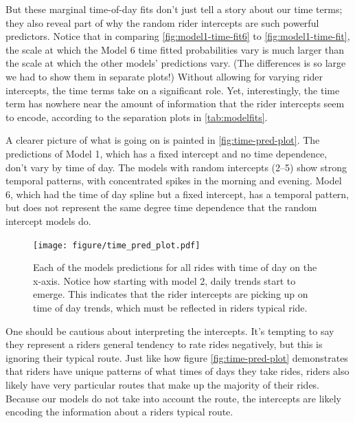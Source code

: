 \documentclass[12pt,twoside]{reedthesis}
\begin{document}
  But these marginal time-of-day fits don't just tell a story about our
  time terms; they also reveal part of why the random rider intercepts are
  such powerful predictors. Notice that in comparing
  \autoref{fig:model1-time-fit6} to \autoref{fig:model1-time-fit}, the
  scale at which the Model 6 time fitted probabilities vary is much larger
  than the scale at which the other models' predictions vary. (The
  differences is so large we had to show them in separate plots!) Without
  allowing for varying rider intercepts, the time terms take on a
  significant role. Yet, interestingly, the time term has nowhere near the
  amount of information that the rider intercepts seem to encode,
  according to the separation plots in \autoref{tab:modelfits}.
  
  A clearer picture of what is going on is painted in
  \autoref{fig:time-pred-plot}. The predictions of Model 1, which has a
  fixed intercept and no time dependence, don't vary by time of day. The
  models with random intercepts (2--5) show strong temporal patterns, with
  concentrated spikes in the morning and evening. Model 6, which had the
  time of day spline but a fixed intercept, has a temporal pattern, but
  does not represent the same degree time dependence that the random
  intercept models do.
  
  \begin{figure}[tbh]
  \centering
  \texttt{[image: figure/time\_pred\_plot.pdf]}
  \caption[Each of the models predictions for all rides with time of day on the x-axis.
  Notice how starting with model 2, daily trends start to emerge. This indicates that the
  rider intercepts are picking up on time of day trends, which must be reflected in riders
  typical ride.]{\normalsize{Each of the models predictions for all rides with time of day on the x-axis.
  Notice how starting with model 2, daily trends start to emerge. This indicates that the
  rider intercepts are picking up on time of day trends, which must be reflected in riders
  typical ride.}}
  \label{fig:time-pred-plot}
  \end{figure}
  
  One should be cautious about interpreting the intercepts. It's tempting
  to say they represent a riders general tendency to rate rides
  negatively, but this is ignoring their typical route. Just like how
  figure \autoref{fig:time-pred-plot} demonstrates that riders have unique
  patterns of what times of days they take rides, riders also likely have
  very particular routes that make up the majority of their rides. Because
  our models do not take into account the route, the intercepts are likely
  encoding the information about a riders typical route.
  
\end{document}
